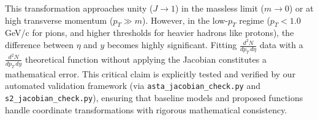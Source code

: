 This transformation approaches unity ($J \to 1$) in the massless limit ($m \to 0$) or at high transverse momentum ($p_T \gg m$). However, in the low-$p_T$ regime ($p_T < 1.0$ GeV/c for pions, and higher thresholds for heavier hadrons like protons), the difference between $\eta$ and $y$ becomes highly significant. Fitting $\frac{d^2N}{dp_T \, d\eta}$ data with a $\frac{d^2N}{dp_T \, dy}$ theoretical function without applying the Jacobian constitutes a mathematical error. This critical claim is explicitly tested and verified by our automated validation framework (via \texttt{asta\_jacobian\_check.py} and \texttt{s2\_jacobian\_check.py}), ensuring that baseline models and proposed functions handle coordinate transformations with rigorous mathematical consistency.
